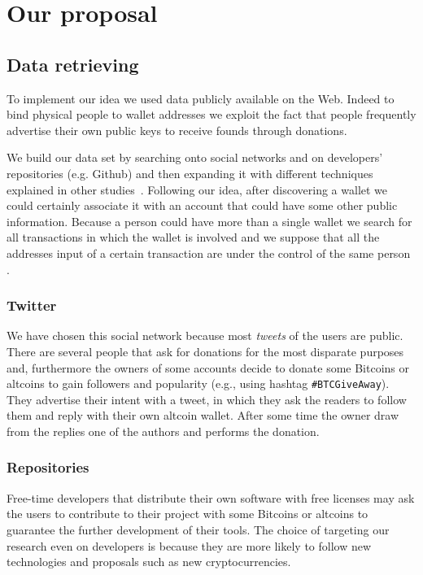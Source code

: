 \section{Our proposal}
\label{proposal}

\subsection{Data retrieving}
To implement our idea we used data publicly available on the Web. Indeed
to bind physical people to wallet addresses we exploit the fact that
people frequently advertise their own public keys to receive founds
through donations.

We build our data set by searching onto social networks and on developers'
repositories (e.g. Github) and then expanding it with different techniques
explained in other studies~\cite{bib:fistful}. Following our idea, after
discovering a wallet we could certainly associate it with an account that could
have some other public information. Because a person could have more than a
single wallet we search for all transactions in which the wallet is involved
and we suppose that all the addresses input of a certain transaction are under
the control of the same person \cite{bib:satoshi} \cite{bib:deanon}
\cite{bib:fistful}.

\subsubsection*{Twitter}
We have chosen this social network because most \textit{tweets} of the users are
public. There are several people that ask for donations for the most disparate
purposes and, furthermore the owners of some accounts decide to donate some
Bitcoins or altcoins to gain followers and popularity (e.g., using hashtag
\texttt{\#BTCGiveAway}). They advertise their intent with a tweet, in which
they ask the readers to follow them and reply with their own altcoin wallet.
After some time the owner draw from the replies one of the authors and performs
the donation.

\subsubsection*{Repositories}
Free-time developers that distribute their own software with free licenses may
ask the users to contribute to their project with some Bitcoins or altcoins to
guarantee the further development of their tools. The choice of targeting our
research even on developers is because they are more likely to follow new
technologies and proposals such as new cryptocurrencies. 

